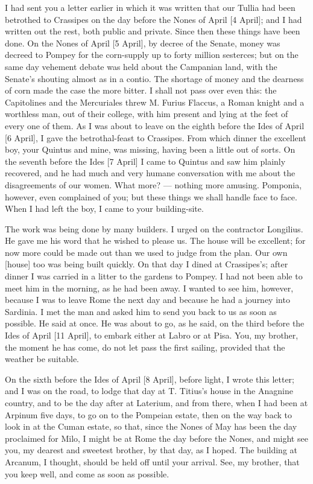 

 I had sent you a letter earlier in which it was written that our Tullia had been betrothed to Crassipes on the day before the Nones of April [4 April]; and I had written out the rest, both public and private. Since then these things have been done. On the Nones of April [5 April], by decree of the Senate, money was decreed to Pompey for the corn-supply up to forty million sesterces; but on the same day vehement debate was held about the Campanian land, with the Senate's shouting almost as in a contio. The shortage of money and the dearness of corn made the case the more bitter. I shall not pass over even this: the Capitolines and the Mercuriales threw M. Furius Flaccus, a Roman knight and a worthless man, out of their college, with him present and lying at the feet of every one of them. As I was about to leave on the eighth before the Ides of April [6 April], I gave the betrothal-feast to Crassipes. From which dinner the excellent boy, your Quintus and mine, was missing, having been a little out of sorts. On the seventh before the Ides [7 April] I came to Quintus and saw him plainly recovered, and he had much and very humane conversation with me about the disagreements of our women. What more? --- nothing more amusing. Pomponia, however, even complained of you; but these things we shall handle face to face. When I had left the boy, I came to your building-site.

 The work was being done by many builders. I urged on the contractor Longilius. He gave me his word that he wished to please us. The house will be excellent; for now more could be made out than we used to judge from the plan. Our own [house] too was being built quickly. On that day I dined at Crassipes's; after dinner I was carried in a litter to the gardens to Pompey. I had not been able to meet him in the morning, as he had been away. I wanted to see him, however, because I was to leave Rome the next day and because he had a journey into Sardinia. I met the man and asked him to send you back to us as soon as possible. He said at once. He was about to go, as he said, on the third before the Ides of April [11 April], to embark either at Labro or at Pisa. You, my brother, the moment he has come, do not let pass the first sailing, provided that the weather be suitable.

 On the sixth before the Ides of April [8 April], before light, I wrote this letter; and I was on the road, to lodge that day at T. Titius's house in the Anagnine country, and to be the day after at Laterium, and from there, when I had been at Arpinum five days, to go on to the Pompeian estate, then on the way back to look in at the Cuman estate, so that, since the Nones of May has been the day proclaimed for Milo, I might be at Rome the day before the Nones, and might see you, my dearest and sweetest brother, by that day, as I hoped. The building at Arcanum, I thought, should be held off until your arrival. See, my brother, that you keep well, and come as soon as possible.
